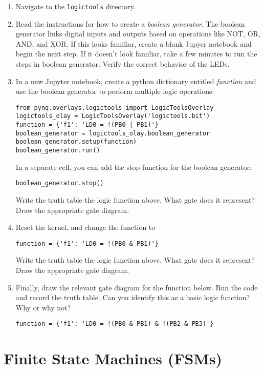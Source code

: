 \documentclass{article}
\begin{document}
\begin{enumerate}
\item Navigate to the \verb+logictools+ directory.
\item Read the instructions for how to create a \textit{boolean generator}.  The boolean generator links digital inputs and outputs based on operations like NOT, OR, AND, and XOR.  If this looks familiar, create a blank Jupyer notebook and begin the next step.  If it doesn't look familiar, take a few minutes to run the steps in boolean generator.  Verify the correct behavior of the LEDs.
\item In a new Jupyter notebook, create a python dictionary entitled \textit{function} and use the boolean generator to perform multiple logic operations:
\begin{verbatim}
from pynq.overlays.logictools import LogicToolsOverlay
logictools_olay = LogicToolsOverlay('logictools.bit')
function = {'f1': 'LD0 = !(PB0 | PB1)'}
boolean_generator = logictools_olay.boolean_generator
boolean_generator.setup(function)
boolean_generator.run()
\end{verbatim}
In a separate cell, you can add the stop function for the boolean generator:
\begin{verbatim}
boolean_generator.stop()
\end{verbatim}
Write the truth table the logic function above.  What gate does it represent?  Draw the appropriate gate diagram.  \\ \vspace{0.5cm}
\item Reset the kernel, and change the function to 
\begin{verbatim}
function = {'f1': 'LD0 = !(PB0 & PB1)'}
\end{verbatim}
Write the truth table the logic function above.  What gate does it represent?  Draw the appropriate gate diagram.  \\ \vspace{0.5cm}
\item Finally, draw the relevant gate diagram for the function below.  Run the code and record the truth table.  Can you identify this as a basic logic function?  Why or why not?  
\begin{verbatim}
function = {'f1': 'LD0 = !(PB0 & PB1) & !(PB2 & PB3)'}
\end{verbatim}
\end{enumerate}

\section{Finite State Machines (FSMs)}
\end{document}
